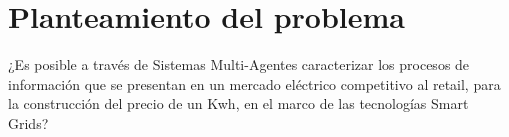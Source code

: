 \section{Planteamiento del problema}


¿Es posible a través de Sistemas Multi-Agentes caracterizar los procesos de información que se presentan en un mercado eléctrico competitivo al retail, para la construcción del precio de un Kwh, en el marco de las tecnologías Smart Grids?

